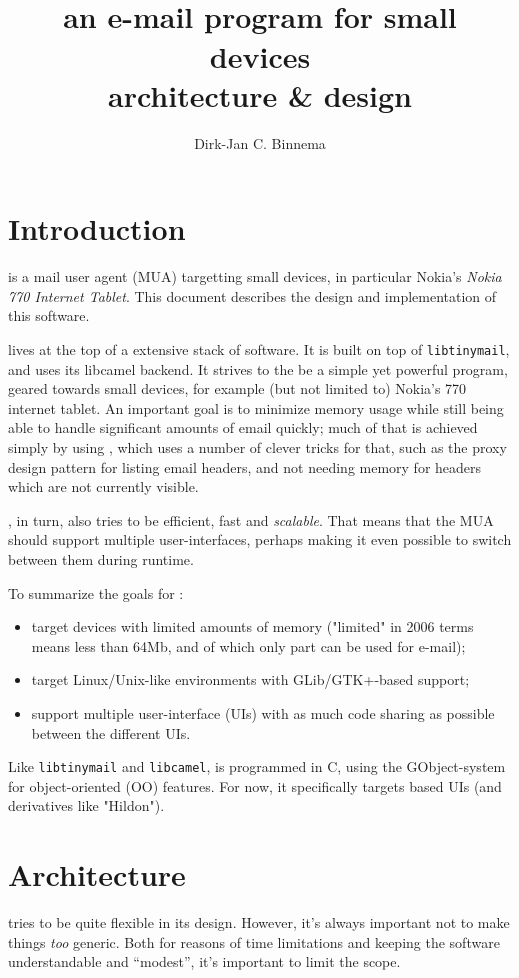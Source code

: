 \documentclass{book}
\author{Dirk-Jan C. Binnema\\\djcbemail}
\title{{\huge \modest}\\
an e-mail program for small devices\\
architecture \& design}
\begin{document}
\maketitle
\tableofcontents
\chapter*{Introduction}
\modest is a mail user agent (MUA) targetting small devices, in particular
Nokia's {\em Nokia 770 Internet Tablet}. This document describes the design
and implementation of this software.

\modest lives at the top of a extensive stack of software. It is built on
top of {\tt libtinymail}, and uses its libcamel backend. It strives to the be
a simple yet powerful program, geared towards small devices, for example (but
not limited to) Nokia's 770 internet tablet. An important goal is to minimize
memory usage while still being able to handle significant amounts of email
quickly; much of that is achieved simply by using \tinymail, which
uses a number of clever tricks for that, such as the proxy design pattern for
listing email headers, and not needing memory for headers which are not
currently visible.

\modest, in turn, also tries to be efficient, fast and {\em scalable}. That
means that the MUA should support multiple user-interfaces, perhaps making it
even possible to switch between them during runtime. 

To summarize the goals for \modest:
\begin{itemize}
\item target devices with limited amounts of memory ("limited" in 2006 terms means
  less than 64Mb, and of which only part can be used for e-mail);
\item target Linux/Unix-like environments with GLib/GTK+-based support;
\item support multiple user-interface (UIs) with as
  much code sharing as possible between the different UIs.
\end{itemize}

Like {\tt libtinymail} and {\tt libcamel}, \modest is programmed in C, using the
GObject-system for object-oriented (OO) features. For now, it specifically
targets \gtk based UIs (and derivatives like "Hildon"). 

\chapter{Architecture}
\modest tries to be quite flexible in its design. However, it's always
important not to make things {\em too} generic. Both for reasons of time
limitations and keeping the software understandable and ``modest'', it's
important to limit the scope.
\end{document}
